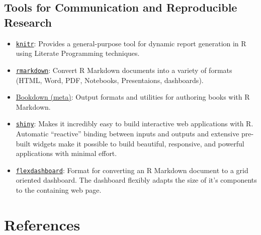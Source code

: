 \documentclass[]{book}
\begin{document}
\section{\texorpdfstring{\textbf{Tools for Communication and
Reproducible
Research}}{Tools for Communication and Reproducible Research}}\label{tools-for-communication-and-reproducible-research}

\begin{itemize}
\item
  \href{http://yihui.name/knitr/}{\texttt{knitr}}: Provides a
  general-purpose tool for dynamic report generation in R using Literate
  Programming techniques.
\item
  \href{http://rmarkdown.rstudio.com/}{\texttt{rmarkdown}}: Convert R
  Markdown documents into a variety of formats (HTML, Word, PDF,
  Notebooks, Presentaions, dashboards).
\item
  \href{https://bookdown.org/yihui/bookdown/}{Bookdown (meta)}: Output
  formats and utilities for authoring books with R Markdown.
\item
  \href{http://shiny.rstudio.com/}{\texttt{shiny}}: Makes it incredibly
  easy to build interactive web applications with R. Automatic
  ``reactive'' binding between inputs and outputs and extensive
  pre-built widgets make it possible to build beautiful, responsive, and
  powerful applications with minimal effort.
\item
  \href{http://rmarkdown.rstudio.com/flexdashboard/}{\texttt{flexdashboard}}:
  Format for converting an R Markdown document to a grid oriented
  dashboard. The dashboard flexibly adapts the size of it's components
  to the containing web page.
\end{itemize}

\chapter{References}\label{references}
\end{document}
